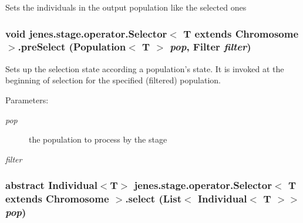Sets the individuals in the output population like the selected ones \hypertarget{classjenes_1_1stage_1_1operator_1_1_selector_3_01_t_01extends_01_chromosome_01_4_752bf2650cbb6760d2fbb68718d62328}{
\subsubsection[preSelect]{\setlength{\rightskip}{0pt plus 5cm}void jenes.stage.operator.Selector$<$ T extends Chromosome $>$.preSelect (Population$<$ T $>$ {\em pop}, \/  Filter {\em filter})}}
\label{classjenes_1_1stage_1_1operator_1_1_selector_3_01_t_01extends_01_chromosome_01_4_752bf2650cbb6760d2fbb68718d62328}


Sets up the selection state according a population's state. It is invoked at the beginning of selection for the specified (filtered) population.

\begin{Desc}
\item[Parameters:]
\begin{description}
\item[{\em pop}]the population to process by the stage \item[{\em filter}]\end{description}
\end{Desc}
\hypertarget{classjenes_1_1stage_1_1operator_1_1_selector_3_01_t_01extends_01_chromosome_01_4_f6cf22a6d6e70ffd74ee1f042a16dcd9}{
\subsubsection[select]{\setlength{\rightskip}{0pt plus 5cm}abstract Individual$<$T$>$ jenes.stage.operator.Selector$<$ T extends Chromosome $>$.select (List$<$ Individual$<$ T $>$$>$ {\em pop})}}
\label{classjenes_1_1stage_1_1operator_1_1_selector_3_01_t_01extends_01_chromosome_01_4_f6cf22a6d6e70ffd74ee1f042a16dcd9}


